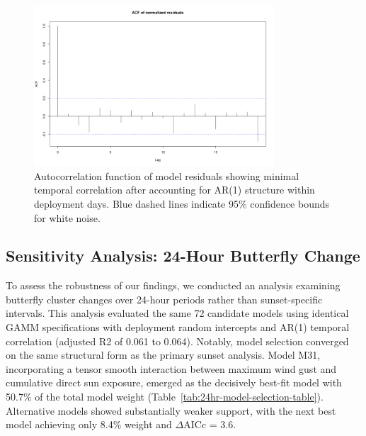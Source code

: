 \begin{figure}[htbp]
    \centering
    \includegraphics[width=0.8\textwidth]{supplemental/results/sunset/figures/diag_acf.png}
    \caption{Autocorrelation function of model residuals showing minimal temporal correlation after accounting for AR(1) structure within deployment days. Blue dashed lines indicate 95\% confidence bounds for white noise.}
    \label{fig:acf_diagnostics_sunset}
\end{figure}

\subsection{Sensitivity Analysis: 24-Hour Butterfly Change}

To assess the robustness of our findings, we conducted an analysis examining butterfly cluster changes over 24-hour periods rather than sunset-specific intervals. This analysis evaluated the same 72 candidate models using identical GAMM specifications with deployment random intercepts and AR(1) temporal correlation (adjusted R2 of 0.061 to 0.064). Notably, model selection converged on the same structural form as the primary sunset analysis. Model M31, incorporating a tensor smooth interaction between maximum wind gust and cumulative direct sun exposure, emerged as the decisively best-fit model with 50.7\% of the total model weight (Table~\ref{tab:24hr-model-selection-table}). Alternative models showed substantially weaker support, with the next best model achieving only 8.4\% weight and $\Delta$AICc = 3.6.




